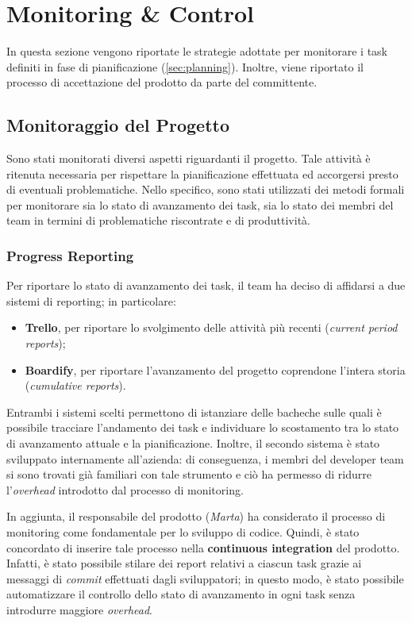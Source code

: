 \usepackage{eurosym}\section{Monitoring \& Control}
\label{sec:monitoring}

In questa sezione vengono riportate le strategie adottate per monitorare i task definiti in fase di pianificazione (\ref{sec:planning}). Inoltre, viene riportato il processo di accettazione del prodotto da parte del committente.

\subsection{Monitoraggio del Progetto}
Sono stati monitorati diversi aspetti riguardanti il progetto. Tale attività è ritenuta necessaria per rispettare la pianificazione effettuata ed accorgersi presto di eventuali problematiche. Nello specifico, sono stati utilizzati dei metodi formali per monitorare sia lo stato di avanzamento dei task, sia lo stato dei membri del team in termini di problematiche riscontrate e di produttività.

\subsubsection{Progress Reporting}
Per riportare lo stato di avanzamento dei task, il team ha deciso di affidarsi a due sistemi di reporting; in particolare:
\begin{itemize}
    \item \textbf{Trello}, per riportare lo svolgimento delle attività più recenti (\textit{current period reports});
    \item \textbf{Boardify}, per riportare l'avanzamento del progetto coprendone l'intera storia (\textit{cumulative reports}).
\end{itemize}
Entrambi i sistemi scelti permettono di istanziare delle bacheche sulle quali è possibile tracciare l'andamento dei task e individuare lo scostamento tra lo stato di avanzamento attuale e la pianificazione. Inoltre, il secondo sistema è stato sviluppato internamente all'azienda: di conseguenza, i membri del developer team si sono trovati già familiari con tale strumento e ciò ha permesso di ridurre l'\textit{overhead} introdotto dal processo di monitoring.

In aggiunta, il responsabile del prodotto (\textit{Marta}) ha considerato il processo di monitoring come fondamentale per lo sviluppo di codice. Quindi, è stato concordato di inserire tale processo nella \textbf{continuous integration} del prodotto. Infatti, è stato possibile stilare dei report relativi a ciascun task grazie ai messaggi di \textit{commit} effettuati dagli sviluppatori; in questo modo, è stato possibile automatizzare il controllo dello stato di avanzamento in ogni task senza introdurre maggiore \textit{overhead}.

